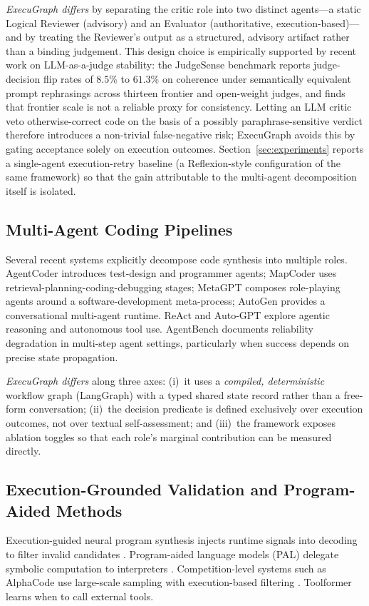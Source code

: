 \documentclass[journal]{IEEEtran}
\begin{document}
\textit{ExecuGraph differs} by separating the critic role into two distinct agents---a static Logical Reviewer (advisory) and an Evaluator (authoritative, execution-based)---and by treating the Reviewer's output as a structured, advisory artifact rather than a binding judgement. This design choice is empirically supported by recent work on LLM-as-a-judge stability: the JudgeSense benchmark \cite{judgesense2026} reports judge-decision flip rates of $8.5$\% to $61.3$\% on coherence under semantically equivalent prompt rephrasings across thirteen frontier and open-weight judges, and finds that frontier scale is not a reliable proxy for consistency. Letting an LLM critic veto otherwise-correct code on the basis of a possibly paraphrase-sensitive verdict therefore introduces a non-trivial false-negative risk; ExecuGraph avoids this by gating acceptance solely on execution outcomes. Section~\ref{sec:experiments} reports a single-agent execution-retry baseline (a Reflexion-style configuration of the same framework) so that the gain attributable to the multi-agent decomposition itself is isolated.

\subsection{Multi-Agent Coding Pipelines}
Several recent systems explicitly decompose code synthesis into multiple roles. AgentCoder \cite{huang2023agentcoder} introduces test-design and programmer agents; MapCoder \cite{islam2024mapcoder} uses retrieval-planning-coding-debugging stages; MetaGPT \cite{hong2023metagpt} composes role-playing agents around a software-development meta-process; AutoGen \cite{wu2023autogen} provides a conversational multi-agent runtime. ReAct \cite{yao2023react} and Auto-GPT \cite{yang2023autogpt} explore agentic reasoning and autonomous tool use. AgentBench \cite{liu2023agentbench} documents reliability degradation in multi-step agent settings, particularly when success depends on precise state propagation.

\textit{ExecuGraph differs} along three axes: (i)~it uses a \emph{compiled, deterministic} workflow graph (LangGraph) with a typed shared state record rather than a free-form conversation; (ii)~the decision predicate is defined exclusively over execution outcomes, not over textual self-assessment; and (iii)~the framework exposes ablation toggles so that each role's marginal contribution can be measured directly.

\subsection{Execution-Grounded Validation and Program-Aided Methods}
Execution-guided neural program synthesis injects runtime signals into decoding to filter invalid candidates \cite{chen2018executionguided}. Program-aided language models (PAL) delegate symbolic computation to interpreters \cite{gao2023pal}. Competition-level systems such as AlphaCode use large-scale sampling with execution-based filtering \cite{li2022alphacode}. Toolformer \cite{schick2023toolformer} learns when to call external tools.
\end{document}
